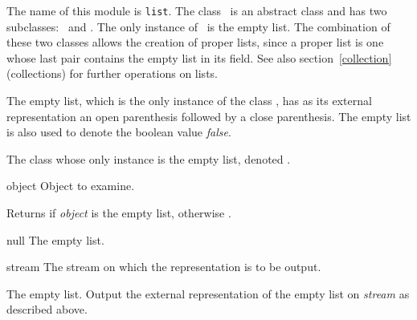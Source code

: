 \label{null}
\label{list}
\label{pair}
%
\begin{optDefinition}
The name of this module is {\tt list}.  The class \ is an
abstract class and has two subclasses: \ and .
The only instance of \ is the empty list.  The combination of
these two classes allows the creation of proper lists, since a proper list is
one whose last pair contains the empty list in its  field.  See
also section~\ref{collection} (collections) for further operations on lists.


\syntaxform{()}
%
\remarks%
The empty list,
which is the only instance of the class , has as its
external representation an open parenthesis followed by a close
parenthesis.  The empty list is also used to denote the boolean value
{\em false}.


The class whose only instance is the empty list, denoted \nil.

%
\begin{arguments}
    \item[object] Object to examine.
\end{arguments}
%
\result%
Returns \true\/ if {\em object} is the empty list, otherwise \nil.

%
\begin{specargs}
    \item[null] The empty list.
    \item[stream] The stream on which the representation is to be output.
\end{specargs}
%
\result%
The empty list.
%
\remarks%
Output the external representation of the empty list on {\em stream\/}
as described above.


\end{optDefinition}
